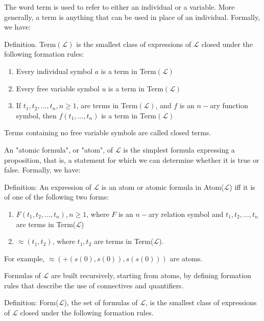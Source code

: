 \documentclass{article}
\begin{document}
The word term is used to refer to either an individual or a variable. More generally, a term is anything that can be used in place of an individual. Formally, we have:

Definition. Term$(\mathcal{L})$ is the smallest class of expressions of $\mathcal{L}$ closed under the following formation rules:

\begin{enumerate}
    \item Every individual symbol $a$ is a term in Term$(\mathcal{L})$
    \item Every free variable symbol $u$ is a term in Term$(\mathcal{L})$
    \item If $t_1, t_2, \ldots, t_n, n \ge 1$, are terms in Term$(\mathcal{L})$, and $f$ is an $n-$ary function symbol, then $f(t_1, \ldots, t_n)$ is a term in Term$(\mathcal{L})$
\end{enumerate}

Terms containing no free variable symbols are called closed terms.

An "atomic formula", or "atom", of $\mathcal{L}$ is the simplest formula expressing a proposition, that is, a statement for which we can determine whether it is true or false. Formally, we have:

Definition: An expression of $\mathcal{L}$ is an atom or atomic formula in Atom($\mathcal{L}$) iff it is of one of the following two forms:

\begin{enumerate}
    \item $F(t_1, t_2, \ldots, t_n), n \ge 1$, where $F$ is an $n-$ary relation symbol and $t_1, t_2, \ldots, t_n$ are terms in Term($\mathcal{L}$)
    \item $\approx (t_1, t_2)$, where $t_1, t_2$ are terms in Term($\mathcal{L}$). 
\end{enumerate}

For example, $\approx (+(s(0), s(0)), s(s(0)))$ are atoms.

Formulas of $\mathcal{L}$ are built recursively, starting from atoms, by defining formation rules that describe the use of connectives and quantifiers. 

Definition: Form($\mathcal{L}$), the set of formulas of $\mathcal{L}$, is the smallest class of expressions of $\mathcal{L}$ closed under the following formation rules. 
\end{document}
